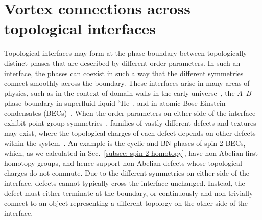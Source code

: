 \chapter{Vortex connections across topological interfaces}\label{chap: spin-2}
Topological interfaces may form at the phase boundary between
topologically distinct phases that are described by different order parameters.
In such an interface, the phases can coexist in such a way that the different
symmetries connect smoothly across the boundary.
These interfaces arise in many areas of physics, such as in the context of
domain walls in the early universe~\cite{Zeldovich1975,Kibble1976,Kibble1980},
the \(A\)--\(B\) phase boundary in superfluid liquid \(^3\)He~\cite{
    Osheroff1977,Yip1986,Salomaa1987,Finne2006,Bradley2008,Volovik2009}, and in
atomic Bose-Einstein condensates (BECs)~\cite{Takeuchi2006,Kasamatsu2010,
    Borgh2012,Borgh2013, Borgh2014,Kaneda2014}.
When the order parameters on either side of the interface exhibit point-group
symmetries~\cite{Xiao2022}, families of vastly different defects
and textures may exist, where the topological charges of each defect depends
on other defects within the system~\cite{Poenaru1977, Mermin1979}.
An example is the cyclic and BN phases of spin-2 BECs, which, as we calculated
in Sec.~\ref{subsec: spin-2-homotopy}, have non-Abelian first homotopy groups,
and hence support non-Abelian defects whose topological charges do not commute.
Due to the different symmetries on either side of the interface, defects cannot
typically cross the interface unchanged.
Instead, the defect must either terminate at the boundary, or continuously
and non-trivially connect to an object representing a different topology on the
other side of the interface.

